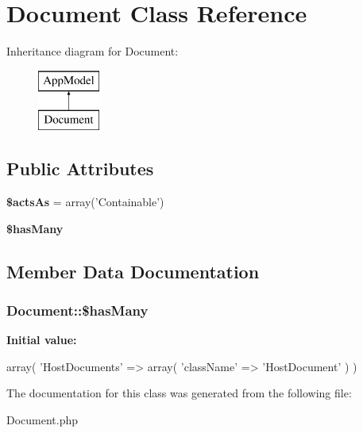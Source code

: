 \hypertarget{classDocument}{
\section{\-Document \-Class \-Reference}
\label{classDocument}
}
\-Inheritance diagram for \-Document\-:\begin{figure}[H]
\begin{center}
\leavevmode
\includegraphics[height=2.000000cm]{classDocument}
\end{center}
\end{figure}
\subsection*{\-Public \-Attributes}
\begin{DoxyCompactItemize}
\item 
\hypertarget{classDocument_a2cfa66284e5e3bcf565f238c7668b5c4}{
{\bfseries \$acts\-As} = array('\-Containable')}
\label{classDocument_a2cfa66284e5e3bcf565f238c7668b5c4}

\item 
{\bfseries \$has\-Many}
\end{DoxyCompactItemize}


\subsection{\-Member \-Data \-Documentation}
\hypertarget{classDocument_a398af2fb193ebc1cf36ab87dec12eb3d}{
\subsubsection[{\$has\-Many}]{\setlength{\rightskip}{0pt plus 5cm}\-Document\-::\$has\-Many}}
\label{classDocument_a398af2fb193ebc1cf36ab87dec12eb3d}
{\bfseries \-Initial value\-:}
\begin{DoxyCode}
 array(
        'HostDocuments' => array(
            'className' => 'HostDocument'
        )
    )
\end{DoxyCode}


\-The documentation for this class was generated from the following file\-:\begin{DoxyCompactItemize}
\item 
\-Document.\-php\end{DoxyCompactItemize}

